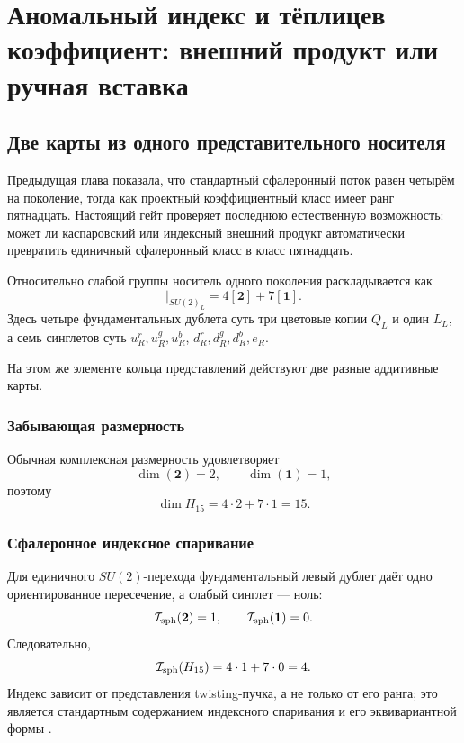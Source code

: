 \chapter{Аномальный индекс и тёплицев коэффициент: внешний продукт или ручная вставка}
\label{ch:v6-spectral-transition-anomaly-to-toeplitz-product-map-gate}

\section{Две карты из одного представительного носителя}

Предыдущая глава показала, что стандартный сфалеронный поток равен
четырём на поколение, тогда как проектный коэффициентный класс имеет
ранг пятнадцать. Настоящий гейт проверяет последнюю естественную
возможность: может ли каспаровский или индексный внешний продукт
автоматически превратить единичный сфалеронный класс в класс пятнадцать.

Относительно слабой группы носитель одного поколения раскладывается как
\begin{equation}
 [H_{15}]\big|_{SU(2)_L}
 =4[\mathbf2]+7[\mathbf1].
 \label{eq:v6-anomaly-product-representation-ring}
\end{equation}
Здесь четыре фундаментальных дублета суть три цветовые копии $Q_L$ и
один $L_L$, а семь синглетов суть $u_R^r,u_R^g,u_R^b$,
$d_R^r,d_R^g,d_R^b,e_R$.

На этом же элементе кольца представлений действуют две разные аддитивные
карты.

\subsection*{Забывающая размерность}

Обычная комплексная размерность удовлетворяет
\begin{equation}
 \dim(\mathbf2)=2,
 \qquad
 \dim(\mathbf1)=1,
\end{equation}
поэтому
\begin{equation}
 \dim H_{15}=4\cdot2+7\cdot1=15.
 \label{eq:v6-anomaly-product-dimension-fifteen}
\end{equation}

\subsection*{Сфалеронное индексное спаривание}

Для единичного $SU(2)$-перехода фундаментальный левый дублет даёт одно
ориентированное пересечение, а слабый синглет --- ноль:
\begin{equation}
 \mathcal I_{\rm sph}(\mathbf2)=1,
 \qquad
 \mathcal I_{\rm sph}(\mathbf1)=0.
\end{equation}
Следовательно,
\begin{equation}
 \mathcal I_{\rm sph}(H_{15})=4\cdot1+7\cdot0=4.
 \label{eq:v6-anomaly-product-index-four}
\end{equation}
Индекс зависит от представления twisting-пучка, а не только от его
ранга; это является стандартным содержанием индексного спаривания и его
эквивариантной формы
\cite{anomaly-product-atiyah-singer1968,
anomaly-product-aps1975}.

